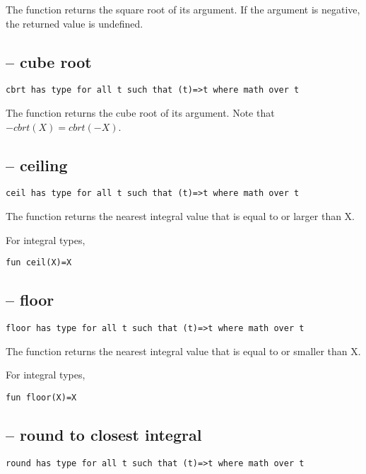 The  function returns the square root of its argument. If the argument is negative, the returned value is undefined.

\subsection{ -- cube root}
\begin{lstlisting}
cbrt has type for all t such that (t)=>t where math over t
\end{lstlisting}

The  function returns the cube root of its argument. Note that $-cbrt(X)=cbrt(-X)$.

\subsection{ -- ceiling}
\begin{lstlisting}
ceil has type for all t such that (t)=>t where math over t
\end{lstlisting}

The  function returns the nearest integral value that is equal to or larger than X.
\begin{aside}
For integral types,
\begin{lstlisting}
fun ceil(X)=X
\end{lstlisting}
\end{aside}

\subsection{ -- floor}
\begin{lstlisting}
floor has type for all t such that (t)=>t where math over t
\end{lstlisting}

The  function returns the nearest integral value that is equal to or smaller than X.
\begin{aside}
For integral types,
\begin{lstlisting}
fun floor(X)=X
\end{lstlisting}
\end{aside}

\subsection{ -- round to closest integral}
\begin{lstlisting}
round has type for all t such that (t)=>t where math over t
\end{lstlisting}

